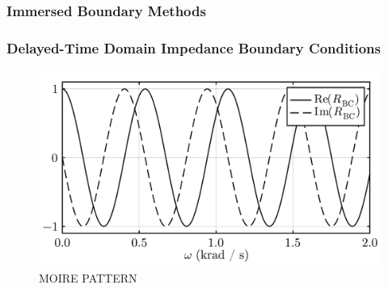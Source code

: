 





\subsubsection{Immersed Boundary Methods}







\subsubsection{Delayed-Time Domain Impedance Boundary Conditions}




\begin{figure}[t]
\centering
\includegraphics[scale=0.35]{assets/graphs/complex_R_Moire.pdf}
\caption{MOIRE PATTERN}
\label{fig:moire}
\end{figure}

